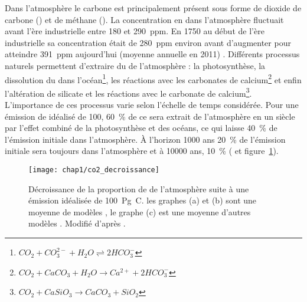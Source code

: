Dans l'atmosphère le carbone est principalement présent sous forme de dioxide de carbone (\coo) et de méthane (\chh).
La concentration en \coo dans l'atmosphère fluctuait avant l'ère industrielle entre 180 et \SI{290}{ppm}.
En 1750 au début de l'ère industrielle sa concentration était de \SI{280}{ppm} environ avant d'augmenter pour atteindre \SI{391}{ppm} aujourd'hui (moyenne annuelle en 2011) \citep{Ciais2014}.
Différents processus naturels permettent d'extraire du \coo de l'atmosphère : la photosynthèse, la dissolution du \coo dans l'océan\footnote{$ CO_{2} + CO_{3}^{2-} + H_{2}O \rightleftharpoons 2HCO_{3}^{-} $}, les réactions avec les carbonates de calcium\footnote{$ CO_{2} + CaCO_{3} + H_{2}O \rightarrow Ca^{2+} + 2HCO_{3}^{-} $} et enfin l'altération de silicate et les réactions avec le carbonate de calcium\footnote{$ CO_{2} + CaSiO_{3} \rightarrow CaCO_{3} + SiO_{2} $}.
L'importance de ces processus varie selon l'échelle de temps considérée.
Pour une émission de \coo idéalisé de \SI{100}{\pgc}, \SI{60}{\percent} de ce \coo sera extrait de l'atmosphère en un siècle par l'effet combiné de la photosynthèse et des océans, ce qui laisse \SI{40}{\percent} de l'émission initiale dans l'atmosphère.
À l'horizon \num{1000} ans \SI{20}{\percent} de l'émission initiale sera toujours dans l'atmosphère et à \num{10000} ans, \SI{10}{\percent} (\citealp{joos2013,Ciais2014} et figure~\ref{fig:co2_decroissance}).
%

\begin{figure}
\centering
\texttt{[image: chap1/co2\_decroissance]}
\caption{Décroissance de la proportion de \coo de l'atmosphère suite à une émission idéalisée de \SI{100}{\peta\gram C}. les graphes (a) et (b) sont une moyenne de modèles \citep{joos2013}, le graphe (c) est une moyenne d'autres modèles \citep{archer2009}. Modifié d'après \citep{Ciais2014}.}
\label{fig:co2_decroissance}
\end{figure}


